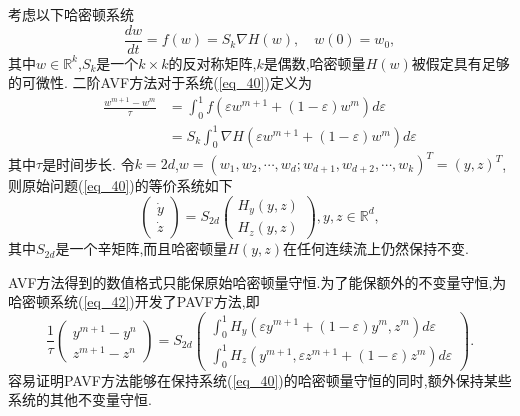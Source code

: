 考虑以下哈密顿系统
\begin{equation}
\frac{d w}{d t}=f(w)=S_{k} \nabla H(w), \quad w(0)=w_{0},
\label{eq_40}\end{equation}
其中$w \in \mathbb{R}^{k}$,$S_{k}$是一个$k \times k$的反对称矩阵,$k$是偶数,哈密顿量$H(w)$被假定具有足够的可微性.
二阶AVF方法对于系统(\ref{eq_40})定义为
\begin{equation}
\begin{aligned}
\frac{w^{m+1}-w^{m}}{\tau} &=\int_{0}^{1} f\left(\varepsilon w^{m+1}+(1-\varepsilon) w^{m}\right) d \varepsilon \\
&=S_{k} \int_{0}^{1} \nabla H\left(\varepsilon w^{m+1}+(1-\varepsilon) w^{m}\right) d \varepsilon
\end{aligned}
\label{eq_41}\end{equation}
其中$\tau$是时间步长.
令$k=2d$,$w=\left(w_{1}, w_{2}, \cdots, w_{d} ; w_{d+1}, w_{d+2}, \cdots, w_{k}\right)^{T}=(y, z)^{T}$,则原始问题(\ref{eq_40})的等价系统如下
\begin{equation}
\left(\begin{array}{l}
\dot{y} \\
\dot{z}
\end{array}\right)=S_{2 d}\left(\begin{array}{c}
H_{y}(y, z) \\
H_{z}(y, z)
\end{array}\right), y, z \in \mathbb{R}^{d},
\label{eq_42}\end{equation}
其中$S_{2 d}$是一个辛矩阵,而且哈密顿量$H(y, z)$在任何连续流上仍然保持不变.

AVF方法得到的数值格式只能保原始哈密顿量守恒.为了能保额外的不变量守恒,为哈密顿系统(\ref{eq_42})开发了PAVF方法,即
\begin{equation}
\frac{1}{\tau}\left(\begin{array}{c}
y^{m+1}-y^{n} \\
z^{m+1}-z^{n}
\end{array}\right)=S_{2 d}\left(\begin{array}{c}
\int_{0}^{1} H_{y}\left(\varepsilon y^{m+1}+(1-\varepsilon) y^{m}, z^{m}\right) d \varepsilon \\
\int_{0}^{1} H_{z}\left(y^{m+1}, \varepsilon z^{m+1}+(1-\varepsilon) z^{m}\right) d \varepsilon
\end{array}\right) .
\label{eq_43}\end{equation}
容易证明PAVF方法能够在保持系统(\ref{eq_40})的哈密顿量守恒的同时,额外保持某些系统的其他不变量守恒.

